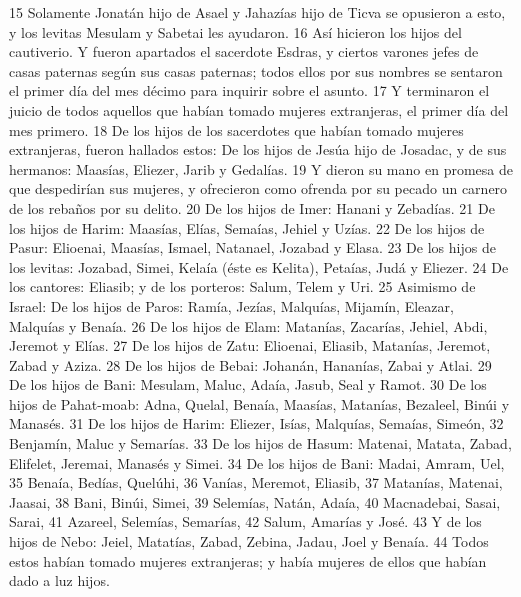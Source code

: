 15 Solamente Jonatán hijo de Asael y Jahazías hijo de Ticva se opusieron a esto, y los levitas Mesulam y Sabetai les ayudaron.
16 Así hicieron los hijos del cautiverio. Y fueron apartados el sacerdote Esdras, y ciertos varones jefes de casas paternas según sus casas paternas; todos ellos por sus nombres se sentaron el primer día del mes décimo para inquirir sobre el asunto.
17 Y terminaron el juicio de todos aquellos que habían tomado mujeres extranjeras, el primer día del mes primero.
18 De los hijos de los sacerdotes que habían tomado mujeres extranjeras, fueron hallados estos: De los hijos de Jesúa hijo de Josadac, y de sus hermanos: Maasías, Eliezer, Jarib y Gedalías.
19 Y dieron su mano en promesa de que despedirían sus mujeres, y ofrecieron como ofrenda por su pecado un carnero de los rebaños por su delito.
20 De los hijos de Imer: Hanani y Zebadías.
21 De los hijos de Harim: Maasías, Elías, Semaías, Jehiel y Uzías.
22 De los hijos de Pasur: Elioenai, Maasías, Ismael, Natanael, Jozabad y Elasa.
23 De los hijos de los levitas: Jozabad, Simei, Kelaía (éste es Kelita), Petaías, Judá y Eliezer.
24 De los cantores: Eliasib; y de los porteros: Salum, Telem y Uri.
25 Asimismo de Israel: De los hijos de Paros: Ramía, Jezías, Malquías, Mijamín, Eleazar, Malquías y Benaía.
26 De los hijos de Elam: Matanías, Zacarías, Jehiel, Abdi, Jeremot y Elías.
27 De los hijos de Zatu: Elioenai, Eliasib, Matanías, Jeremot, Zabad y Aziza.
28 De los hijos de Bebai: Johanán, Hananías, Zabai y Atlai.
29 De los hijos de Bani: Mesulam, Maluc, Adaía, Jasub, Seal y Ramot. 
30 De los hijos de Pahat-moab: Adna, Quelal, Benaía, Maasías, Matanías, Bezaleel, Binúi y Manasés.
31 De los hijos de Harim: Eliezer, Isías, Malquías, Semaías, Simeón,
32 Benjamín, Maluc y Semarías.
33 De los hijos de Hasum: Matenai, Matata, Zabad, Elifelet, Jeremai, Manasés y Simei.
34 De los hijos de Bani: Madai, Amram, Uel,
35 Benaía, Bedías, Quelúhi,
36 Vanías, Meremot, Eliasib,
37 Matanías, Matenai, Jaasai,
38 Bani, Binúi, Simei,
39 Selemías, Natán, Adaía,
40 Macnadebai, Sasai, Sarai,
41 Azareel, Selemías, Semarías,
42 Salum, Amarías y José.
43 Y de los hijos de Nebo: Jeiel, Matatías, Zabad, Zebina, Jadau, Joel y Benaía.
44 Todos estos habían tomado mujeres extranjeras; y había mujeres de ellos que habían dado a luz hijos.

